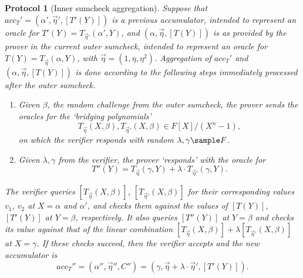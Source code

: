 \documentclass[10pt,article,oneside]{memoir}
\newtheorem{protocol}[]{Protocol}
\theoremstyle{definition}
\theoremstyle{remark}
\begin{document}
\begin{protocol}[Inner sumcheck aggregation]
\label{p:InnerSumcheckAggregation}
Suppose that $acc_T'=(\alpha',\vec\eta',[T'(Y)])$ is a previous accumulator, intended to represent an oracle for $T'(Y)= T_{\vec\eta'}(\alpha',Y)$, and $(\alpha,\vec\eta, [T(Y)])$ is as provided by the prover in the current outer sumcheck, intended to represent an oracle for $T(Y)= T_{\vec\eta}(\alpha,Y)$, with $\vec\eta =(1,\eta,\eta^2)$.
Aggregation of $acc_T'$ and $(\alpha,\vec\eta,[T(Y)])$ is done according to the following steps immediately processed after the outer sumcheck.
\begin{enumerate}
\item
\label{p:InnerSumcheckAggregation:Step1}
Given $\beta$, the random challenge from the outer sumcheck, the prover sends the oracles for the `bridging polynomials'
\[
T_{\vec\eta}(X,\beta), T_{\vec\eta'}(X, \beta)\in F[X]/(X^n-1),
\]
on which the verifier responds with random $\lambda,\gamma\sample F$.

\item
\label{p:InnerSumcheckAggregation:Step2}
Given $\lambda,\gamma$ from the verifier, the prover `responds' with the oracle for
\[
T''(Y) = T_{\vec\eta}(\gamma, Y) + \lambda \cdot  T_{\vec\eta'}(\gamma, Y).
\]
\end{enumerate}
The verifier queries $[T_{\vec\eta}(X,\beta)]$, $[T_{\vec\eta'}(X,\beta)]$ for their corresponding values $v_1$, $v_2$ at $X=\alpha$ and $\alpha'$, and checks them against the values of $[T(Y)]$, $[T'(Y)]$ at $Y=\beta$, respectively.
It also queries $[T''(Y)]$ at $Y=\beta$ and checks its value against that of  the linear combination $[T_{\vec\eta}(X,\beta)]+\lambda [T_{\vec\eta'}(X,\beta)]$ at $X=\gamma$.
If these checks succeed, then the verifier accepts and the new accumulator is 
\[
acc_T''=(\alpha'',\vec\eta'', C'') = (\gamma, \vec\eta + \lambda\cdot \vec\eta', [T'(Y)]).
\]
\end{protocol}
\end{document}
